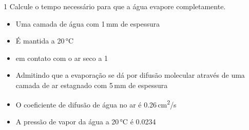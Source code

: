 \documentclass[\mainfilename]{subfiles}
\begin{document}
\begin{exampleBox}1{
    Calcule o tempo necessário para que a água evapore completamente.
} %

    \begin{itemize}
        \item Uma camada de água com 1\,\unit{\milli\metre} de espessura
        \item É mantida a 20\,\unit{\celsius}
        \item em contato com o ar seco a 1\,\unit{\atm}
        \item Admitindo que a evaporação  se dá por difusão molecular através de uma camada de ar estagnado com 5\,\unit{\milli\metre} de espessura
        \item O coeficiente de difusão de água no ar é 0.26\,\unit{\centi\metre^2/\second}
        \item A pressão de vapor da água a 20\,\unit{\celsius} é 0.0234\,\unit{\atm}
    \end{itemize}


\end{exampleBox}
\end{document}

